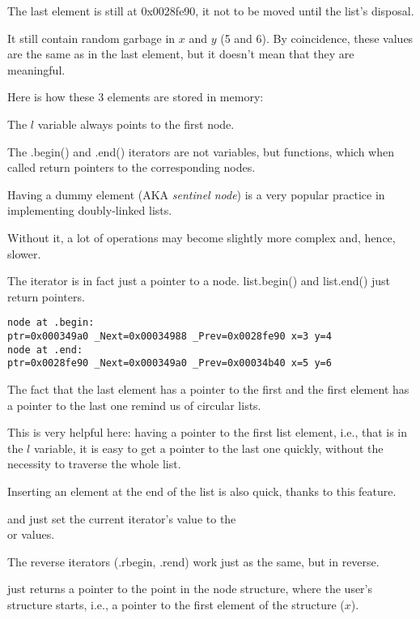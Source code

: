 The last element is still at 0x0028fe90,
it not to be moved until the list's disposal.

It still contain random garbage in $x$ and $y$ (5 and 6). 
By coincidence, these values are the same as in the last element, but it doesn't mean that they are meaningful.

Here is how these 3 elements are stored in memory:



The $l$ variable always points to the first node.

The .begin() and .end() iterators are not variables, but functions, 
which when called return pointers to the corresponding nodes.

Having a dummy element (\ac{AKA} \emph{sentinel node}) is a very popular practice in implementing doubly-linked lists.

Without it, a lot of operations may become slightly more complex and, hence, slower.

The iterator is in fact just a pointer to a node.
list.begin() and list.end() just return pointers.

\begin{lstlisting}
node at .begin:
ptr=0x000349a0 _Next=0x00034988 _Prev=0x0028fe90 x=3 y=4
node at .end:
ptr=0x0028fe90 _Next=0x000349a0 _Prev=0x00034b40 x=5 y=6
\end{lstlisting}

The fact that the last element has a pointer to the first and the first element has a pointer 
to the last one remind us of circular lists.

This is very helpful here: having a pointer to the first list element,
i.e., that is in the $l$ variable,
it is easy to get a pointer to the last one quickly, without the necessity to traverse the whole list.

Inserting an element at the end of the list is also quick, thanks to this feature.

 and  just set the current iterator's value to the \\
 or  values.

The reverse iterators (.rbegin, .rend) work just as the same, but in reverse.

 just returns a pointer to the point 
in the node structure, where the user's structure starts, i.e., a pointer to the 
first element of the structure ($x$).

